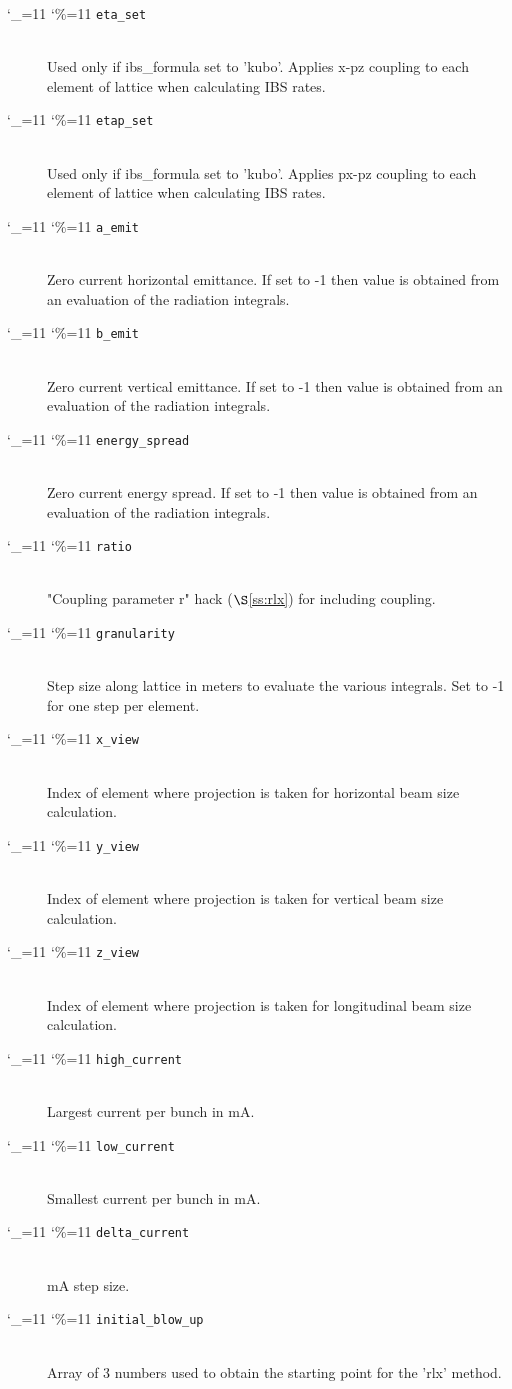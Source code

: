 \documentclass[11pt]{article}
\newcommand{\sref}[1]{$\S$\ref{#1}}
\newcommand\ttcmd{\begingroup\catcode`\_=11 \catcode`\%=11 \dottcmd}
\newcommand\dottcmd[1]{\texttt{#1}\endgroup}
\newcommand{\vn}{\ttcmd}
\newcommand{\Newline}{\hfil \\}
\begin{document}
\begin{description}
  \item[\vn{eta_set}] \Newline
Used only if ibs_formula set to 'kubo'.
Applies x-pz coupling to each
element of lattice when calculating IBS rates.

  \item[\vn{etap_set}] \Newline
Used only if ibs_formula set to 'kubo'. Applies px-pz coupling to
each element of lattice when calculating IBS rates.

  \item[\vn{a_emit}] \Newline
Zero current horizontal emittance. If set to -1 then value is 
obtained from an evaluation of the radiation integrals.

  \item[\vn{b_emit}] \Newline
Zero current vertical emittance. If set to -1 then value is 
obtained from an evaluation of the radiation integrals.

  \item[\vn{energy_spread}] \Newline
Zero current energy spread. If set to -1 then value is 
obtained from an evaluation of the radiation integrals.

  \item[\vn{ratio}] \Newline
"Coupling parameter r" hack (\sref{ss:rlx}) for including coupling.

  \item[\vn{granularity}] \Newline
Step size along lattice in meters to evaluate the various 
integrals.  Set to -1 for one step per element.

  \item[\vn{x_view}] \Newline
Index of element where projection is taken for horizontal beam size
calculation.

  \item[\vn{y_view}] \Newline
Index of element where projection is taken for vertical beam size
calculation.

  \item[\vn{z_view}] \Newline
Index of element where projection is taken for longitudinal beam size
calculation.

  \item[\vn{high_current}] \Newline
Largest current per bunch in mA.

  \item[\vn{low_current}] \Newline
Smallest current per bunch in mA.

  \item[\vn{delta_current}] \Newline
mA step size.

  \item[\vn{initial_blow_up}] \Newline
Array of 3 numbers used to obtain the starting point for the 'rlx' method.


  \end{description}
\end{document}
